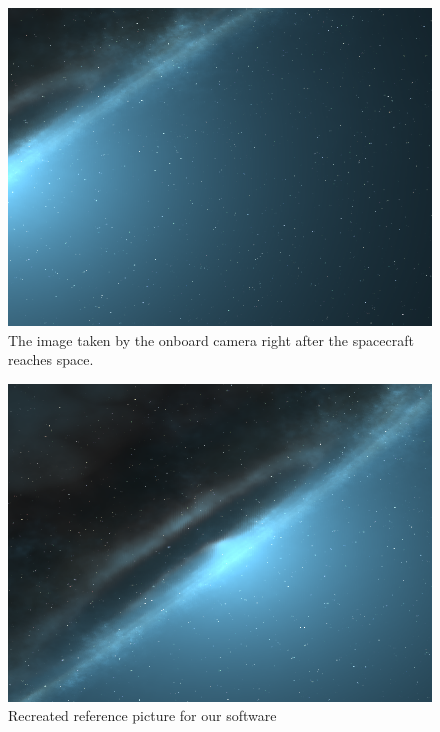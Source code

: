 \documentclass[reprint,english,notitlepage]{revtex4-2}
\begin{document}
\begin{figure}[h]
	\centering
	\includegraphics[scale=0.15]{Python/sky_picture}
	\caption{The image taken by the onboard camera right after the spacecraft reaches space.}\label{fig:sky_picture}
\end{figure}

\begin{figure}[h!]
	\centering
	\includegraphics[scale = 0.2]{Test_Image}
	\caption{Recreated reference picture for our software %
	}
	\label{fig: ref picture}
  \end{figure}
\end{document}
